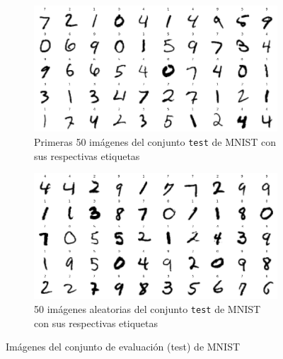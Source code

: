 \begin{figure}[h!]
    \centering
    \begin{subfigure}[b]{0.45\textwidth}
        \centering
        \includegraphics[width=\textwidth]{images/mnist/mnist_test_first50.png}
        \caption{Primeras 50 imágenes del conjunto \texttt{test} de MNIST con sus respectivas etiquetas}
        \label{mnist5}
    \end{subfigure}
    \hspace{1cm}
    \begin{subfigure}[b]{0.45\textwidth}
        \centering
        \includegraphics[width=\textwidth]{images/mnist/mnist_test_random.png}
        \caption{50 imágenes aleatorias del conjunto \texttt{test} de MNIST con sus respectivas etiquetas}
        \label{mnist6}
    \end{subfigure}
    \caption{Imágenes del conjunto de evaluación (test) de MNIST}
    \label{mnist_test}
\end{figure}

